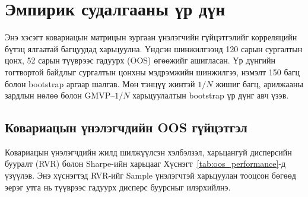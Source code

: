 \section{Эмпирик судалгааны үр дүн}
\label{sec:empirical_results}

Энэ хэсэгт ковариацын матрицын зургаан үнэлэгчийн
гүйцэтгэлийг корреляцийн бүтэц ялгаатай багцуудад
харьцуулна. Үндсэн шинжилгээнд 120 сарын сургалтын
цонх, 52 сарын түүврээс гадуурх (OOS) өгөөжийг
ашигласан. Үр дүнгийн тогтвортой байдлыг сургалтын
цонхны мэдрэмжийн шинжилгээ, нэмэлт 150 багц болон
bootstrap аргаар шалгав. Мөн тэнцүү жинтэй $1/N$ жишиг багц,
арилжааны зардлын нөлөө болон GMVP--$1/N$
харьцуулалтын bootstrap үр дүнг авч үзэв.


\subsection{Ковариацын үнэлэгчдийн OOS гүйцэтгэл}
\label{subsec:oos_performance}

Ковариацын үнэлэгчдийн жилд шилжүүлсэн
хэлбэлзэл, харьцангуй дисперсийн бууралт
(RVR) болон Sharpe-ийн харьцааг
Хүснэгт~\ref{tab:oos_performance}-д үзүүлэв.
Энэ хүснэгтэд RVR-ийг Sample үнэлэгчтэй
харьцуулан тооцсон бөгөөд эерэг утга нь
түүврээс гадуурх дисперс буурсныг илэрхийлнэ.

